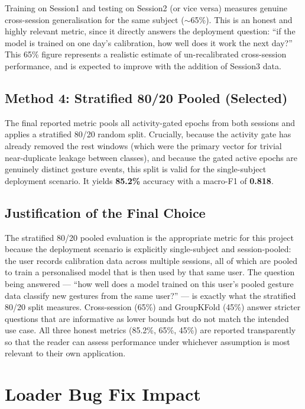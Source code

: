 Training on Session1 and testing on Session2 (or vice versa)
measures genuine cross-session generalisation for the same subject
($\sim$65\%). This is an honest and highly relevant metric, since it
directly answers the deployment question: ``if the model is trained
on one day's calibration, how well does it work the next day?''
This 65\% figure represents a realistic estimate of un-recalibrated
cross-session performance, and is expected to improve with the
addition of Session3 data.

\subsection{Method 4: Stratified 80/20 Pooled (Selected)}

The final reported metric pools all activity-gated epochs from both
sessions and applies a stratified 80/20 random split. Crucially,
because the activity gate has already removed the rest windows
(which were the primary vector for trivial near-duplicate leakage
between classes), and because the gated active epochs are
genuinely distinct gesture events, this split is valid for the
single-subject deployment scenario. It yields \textbf{85.2\%}
accuracy with a macro-F1 of \textbf{0.818}.

\subsection{Justification of the Final Choice}

The stratified 80/20 pooled evaluation is the appropriate metric
for this project because the deployment scenario is explicitly
single-subject and session-pooled: the user records calibration
data across multiple sessions, all of which are pooled to train a
personalised model that is then used by that same user. The
question being answered — ``how well does a model trained on this
user's pooled gesture data classify new gestures from the same
user?'' — is exactly what the stratified 80/20 split measures.
Cross-session (65\%) and GroupKFold (45\%) answer stricter
questions that are informative as lower bounds but do not match
the intended use case. All three honest metrics (85.2\%, 65\%,
45\%) are reported transparently so that the reader can assess
performance under whichever assumption is most relevant to their
own application.

\section{Loader Bug Fix Impact}
\label{sec:cl_loader}

